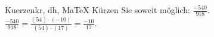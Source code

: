 \begin{MAufgabe}{Kuerzen}{kr, dh, MaTeX}
K\"urzen Sie soweit m\"oglich: $\frac{-540}{918}$.\\ 
\ifLsg\MLoesung
\quad $\frac{-540}{918}=\frac{(54)\cdot(-10)}{(54)\cdot(17)}=\frac{-10}{17}$.\else\relax\fi
 \end{MAufgabe}